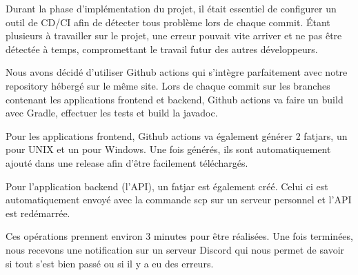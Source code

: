 \documentclass[../rapport.tex]{subfiles}
\begin{document}
Durant la phase d'implémentation du projet, il était essentiel de configurer un outil de CD/CI afin de détecter tous problème lors de chaque commit.
Étant plusieurs à travailler sur le projet, une erreur pouvait vite arriver et ne pas être détectée à temps, compromettant le travail futur des autres développeurs. 

Nous avons décidé d'utiliser Github actions qui s'intègre parfaitement avec notre repository hébergé sur le même site.
Lors de chaque commit sur les branches contenant les applications frontend et backend, Github actions va faire un build avec Gradle, effectuer les tests et build la javadoc. 

Pour les applications frontend, Github actions va également générer 2 fatjars, un pour UNIX et un pour Windows.
Une fois générés, ils sont automatiquement ajouté dans une release afin d'être facilement téléchargés.

Pour l'application backend (l'API), un fatjar est également créé.
Celui ci est automatiquement envoyé avec la commande scp sur un serveur personnel et l'API est redémarrée.

Ces opérations prennent environ 3 minutes pour être réalisées.
Une fois terminées, nous recevons une notification sur un serveur Discord qui nous permet de savoir si tout s'est bien passé ou si il y a eu des erreurs.
\newpage
\end{document}
